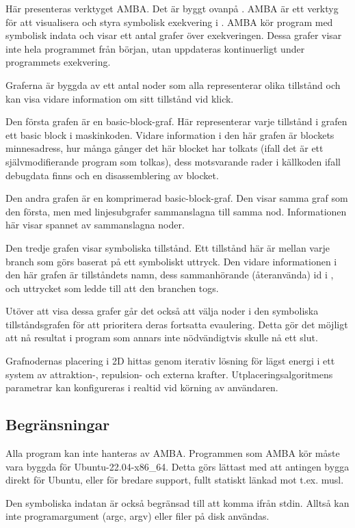 Här presenteras verktyget AMBA. Det är byggt ovanpå \stoe. AMBA är ett
verktyg för att visualisera och styra symbolisk exekvering i \stoe.
AMBA kör program med symbolisk indata och visar ett antal grafer över
exekveringen. Dessa grafer visar inte hela programmet från början,
utan uppdateras kontinuerligt under programmets exekvering.

Graferna är byggda av ett antal noder som alla representerar olika
tillstånd och kan visa vidare information om sitt tillstånd vid klick.

Den första grafen är en basic-block-graf. Här representerar varje
tillstånd i grafen ett basic block i maskinkoden. Vidare information i
den här grafen är blockets minnesadress, hur många gånger det här
blocket har tolkats (ifall det är ett självmodifierande program som
tolkas), dess motsvarande rader i källkoden ifall debugdata finns och
en disassemblering av blocket.

Den andra grafen är en komprimerad basic-block-graf. Den visar samma
graf som den första, men med linjesubgrafer sammanslagna till samma
nod. Informationen här visar spannet av sammanslagna noder.

Den tredje grafen visar symboliska tillstånd. Ett tillstånd här är
mellan varje branch som görs baserat på ett symboliskt
uttryck. Den vidare informationen i den här grafen är tillståndets
namn, dess sammanhörande (återanvända) id i \stoe, och uttrycket som
ledde till att den branchen togs.

Utöver att visa dessa grafer går det också att välja noder i den
symboliska tillståndsgrafen för att prioritera deras fortsatta
evaulering. Detta gör det möjligt att nå resultat i program som annars
inte nödvändigtvis skulle nå ett slut.

Grafnodernas placering i 2D hittas genom iterativ lösning för lägst
energi i ett system av attraktion-, repulsion- och externa
krafter. Utplaceringsalgoritmens parametrar kan konfigureras i realtid
vid körning av användaren.

\subsection{Begränsningar}

Alla program kan inte hanteras av AMBA. Programmen som AMBA kör måste
vara byggda för Ubuntu-22.04-x86\_64. Detta görs lättast med att
antingen bygga direkt för Ubuntu, eller för bredare support, fullt
statiskt länkad mot t.ex. musl.

Den symboliska indatan är också begränsad till att komma ifrån
stdin. Alltså kan inte programargument (argc, argv) eller filer på
disk användas.

